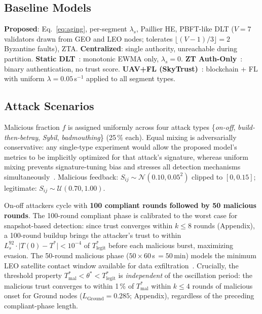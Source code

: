 \documentclass[journal,twoside,10pt]{IEEEtran}
\begin{document}
\subsection{Baseline Models}

\textbf{Proposed}: Eq.~\eqref{eq:aging}, per-segment $\lambda_s$,
Paillier HE, PBFT-like DLT ($V\!=\!7$ validators drawn from GEO and
LEO nodes; tolerates $\lfloor(V\!-\!1)/3\rfloor\!=\!2$ Byzantine
faults), ZTA.
\textbf{Centralized}: single authority, unreachable during partition.
\textbf{Static DLT}~\cite{nxgent}: monotonic EWMA only,
$\lambda_s\!=\!0$.
\textbf{ZT Auth-Only}~\cite{ztisl}: binary authentication, no trust score.
\textbf{UAV+FL (SkyTrust)}~\cite{uav_fl,tong2024}: blockchain + FL with
uniform $\lambda\!=\!0.05$\,s$^{-1}$ applied to all segment types.

\subsection{Attack Scenarios}

Malicious fraction $f$ is assigned uniformly across four attack types
\{\emph{on-off}, \emph{build-then-betray}, \emph{Sybil},
\emph{badmouthing}\} (25\,\% each).
Equal mixing is adversarially conservative: any single-type experiment
would allow the proposed model's metrics to be implicitly optimized for
that attack's signature, whereas uniform mixing prevents signature-tuning
bias and stresses all detection mechanisms simultaneously~\cite{zhou2019}.
Malicious feedback: $S_{ij}\!\sim\!\mathcal{N}(0.10,0.05^2)$ clipped
to $[0,0.15]$; legitimate: $S_{ij}\!\sim\!\mathcal{U}(0.70,1.00)$.

On-off attackers cycle with \textbf{100 compliant rounds followed by
50 malicious rounds}.
The 100-round compliant phase is calibrated to the worst case for
snapshot-based detection: since trust converges within $k\!\leq\!8$
rounds (Appendix), a 100-round buildup brings the attacker's trust to
within $L_s^{92}\!\cdot\!\lvert T(0)\!-\!T^*\rvert < 10^{-4}$ of
$T^*_{\mathrm{legit}}$ before each malicious burst, maximizing
evasion.
The 50-round malicious phase ($50\!\times\!60\,$s\,$=\!50$\,min)
models the minimum LEO satellite contact window available for data
exfiltration~\cite{giordani2020}.
Crucially, the threshold property
$T^*_{\mathrm{mal}} < \theta^* < T^*_{\mathrm{legit}}$ is
\emph{independent} of the oscillation period: the malicious trust
converges to within 1\,\% of $T^*_{\mathrm{mal}}$ within
$k\!\leq\!4$ rounds of malicious onset for Ground nodes
($L_{\mathrm{Ground}}\!=\!0.285$; Appendix), regardless of
the preceding compliant-phase length.
\end{document}
